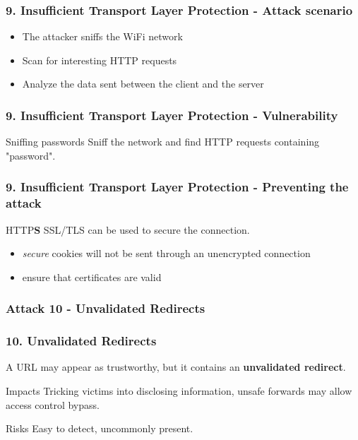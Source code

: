 \begin{frame}
\frametitle{9. Insufficient Transport Layer Protection - Attack scenario}
\begin{itemize}
\item The attacker sniffs the WiFi network
\item Scan for interesting HTTP requests
\item Analyze the data sent between the client and the server
\end{itemize}
\end{frame}

\begin{frame}
\frametitle{9. Insufficient Transport Layer Protection - Vulnerability}
\begin{exampleblock}{Sniffing passwords}
Sniff the network and find HTTP requests containing "password".
\end{exampleblock}
\end{frame}

\begin{frame}
\frametitle{9. Insufficient Transport Layer Protection - Preventing the attack}
\begin{block}{HTTP\textbf{S}}
SSL/TLS can be used to secure the connection.
\begin{itemize}
\item \emph{secure} cookies will not be sent through an unencrypted connection
\item ensure that certificates are valid
\end{itemize}
\end{block}
\end{frame}

\subsubsection{Attack 10 - Unvalidated Redirects}

\begin{frame}
\frametitle{10. Unvalidated Redirects}
A URL may appear as trustworthy, but it contains an \textbf{unvalidated
redirect}.
\begin{block}{Impacts}
Tricking victims into disclosing information, unsafe forwards may allow access
control bypass.
\end{block}
\begin{block}{Risks}
Easy to detect, uncommonly present.
\end{block}
\end{frame}

